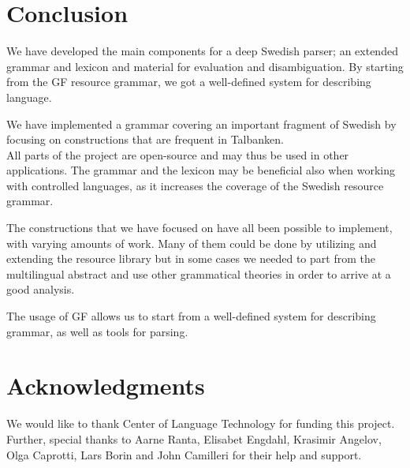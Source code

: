 \documentclass[10pt, a4paper]{article}
\begin{document}
\section{Conclusion}
We have developed the main components
for a deep Swedish parser; an extended grammar and lexicon and material for
evaluation and disambiguation.
By starting from the GF resource grammar, we got a well-defined system for
describing language. 

We have implemented a grammar covering an important fragment of Swedish by
focusing on constructions that are frequent in Talbanken.
\\

All parts of the project are open-source and may thus be used in other applications.
The grammar and the lexicon may be beneficial also when working with controlled languages,
as it increases the coverage of the Swedish resource grammar.

The constructions
that we have focused on have all been possible to implement, with varying  amounts
of work. Many of them could be done by utilizing and extending the resource library
but in some cases we needed to part from the multilingual abstract and use other
grammatical theories in order to arrive at a good analysis.


The usage of GF allows us to start from
a well-defined system for describing grammar, as well as tools for
parsing.

\section{Acknowledgments}
We would like to thank Center of Language Technology for funding this project.
Further, special thanks to Aarne Ranta,
Elisabet Engdahl, Krasimir Angelov, Olga Caprotti, Lars Borin and John Camilleri for their help
and support.



\end{document}
